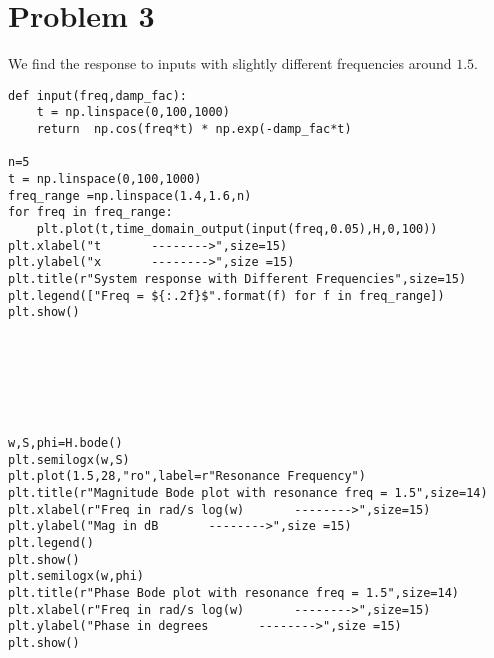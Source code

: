 \documentclass[11pt]{article}
\begin{document}
	

	
		
    \section{Problem 3}\label{problem-3}

We find the response to inputs with slightly different frequencies
around \(1.5\).

	

	
		
	
	
		
	
		
			
		
	
		
			
		
	
		
			
		
	
		
			
		
	
		
			
		
	
		
			
		
	
		
			
		
	
	\begin{Verbatim}
def input(freq,damp_fac):
    t = np.linspace(0,100,1000)
    return  np.cos(freq*t) * np.exp(-damp_fac*t)

n=5
t = np.linspace(0,100,1000)
freq_range =np.linspace(1.4,1.6,n)
for freq in freq_range:
    plt.plot(t,time_domain_output(input(freq,0.05),H,0,100))
plt.xlabel("t       -------->",size=15)
plt.ylabel("x       -------->",size =15)
plt.title(r"System response with Different Frequencies",size=15)
plt.legend(["Freq = ${:.2f}$".format(f) for f in freq_range])
plt.show()



\end{Verbatim}

	
		
	

		
    \begin{center}
    \end{center}
    { \hspace*{\fill} \\}
    
	\begin{verbatim}
	
	
w,S,phi=H.bode()
plt.semilogx(w,S)
plt.plot(1.5,28,"ro",label=r"Resonance Frequency")
plt.title(r"Magnitude Bode plot with resonance freq = 1.5",size=14)
plt.xlabel(r"Freq in rad/s log(w)       -------->",size=15)
plt.ylabel("Mag in dB       -------->",size =15)
plt.legend()
plt.show()
plt.semilogx(w,phi)
plt.title(r"Phase Bode plot with resonance freq = 1.5",size=14)
plt.xlabel(r"Freq in rad/s log(w)       -------->",size=15)
plt.ylabel("Phase in degrees       -------->",size =15)
plt.show()		
    
	\end{verbatim}	
	
\end{document}
